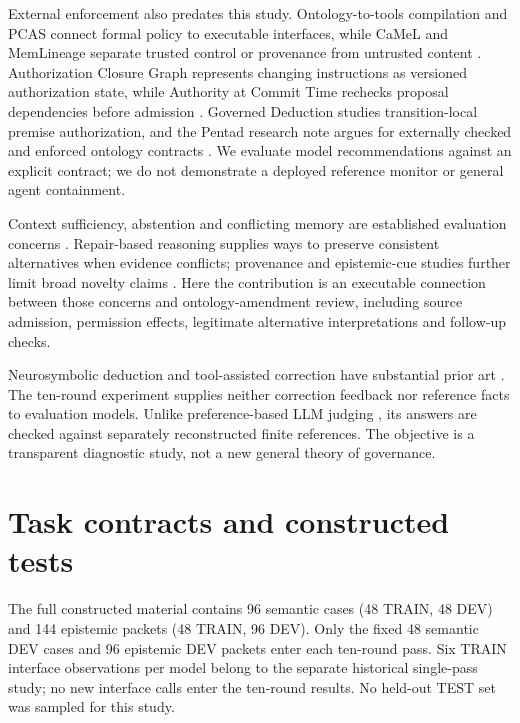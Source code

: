 \documentclass[a4paper,preprint,12pt,numbers,nopreprintline]{elsarticle}
\begin{document}
External enforcement also predates this study. Ontology-to-tools compilation and PCAS connect formal policy to executable interfaces, while CaMeL and MemLineage separate trusted control or provenance from untrusted content \citep{ontologytools,pcas,camel,memlineage}. Authorization Closure Graph represents changing instructions as versioned authorization state, while Authority at Commit Time rechecks proposal dependencies before admission \citep{authorizationclosure,committime}. Governed Deduction studies transition-local premise authorization, and the Pentad research note argues for externally checked and enforced ontology contracts \citep{governeddeduction,pentad}. We evaluate model recommendations against an explicit contract; we do not demonstrate a deployed reference monitor or general agent containment.

Context sufficiency, abstention and conflicting memory are established evaluation concerns \citep{sufficientcontext,abstentionbench,memoryconflict}. Repair-based reasoning supplies ways to preserve consistent alternatives when evidence conflicts; provenance and epistemic-cue studies further limit broad novelty claims \citep{repairkb,graphecho,epistemiccues}. Here the contribution is an executable connection between those concerns and ontology-amendment review, including source admission, permission effects, legitimate alternative interpretations and follow-up checks.

Neurosymbolic deduction and tool-assisted correction have substantial prior art \citep{linc,critic}. The ten-round experiment supplies neither correction feedback nor reference facts to evaluation models. Unlike preference-based LLM judging \citep{mtbench}, its answers are checked against separately reconstructed finite references. The objective is a transparent diagnostic study, not a new general theory of governance.


\section{Task contracts and constructed tests}\label{sec:current-design}
The full constructed material contains 96 semantic cases (48 TRAIN, 48 DEV) and 144 epistemic packets (48 TRAIN, 96 DEV). Only the fixed 48 semantic DEV cases and 96 epistemic DEV packets enter each ten-round pass. Six TRAIN interface observations per model belong to the separate historical single-pass study; no new interface calls enter the ten-round results. No held-out TEST set was sampled for this study.
\end{document}
